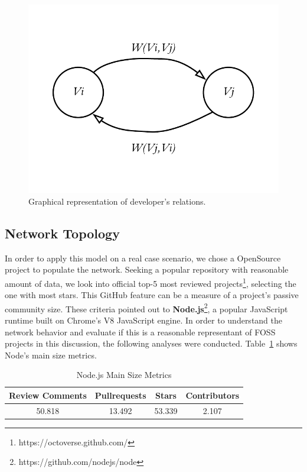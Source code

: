 \documentclass[conference]{IEEEtran}
\begin{document}
\begin{figure}[htbp]
\centerline{\includegraphics{images/graph}}
\caption{Graphical representation of developer's relations.}
\label{fig:graph}
\end{figure}

\subsection{Network Topology}
In order to apply this model on a real case scenario, we chose a OpenSource project to populate the network. Seeking a popular repository with reasonable amount of data, we look into official top-5 most reviewed projects\footnote{https://octoverse.github.com/}, selecting the one with most stars. This GitHub feature can be a measure of a project's passive community size\cite{sheoran2014}. These criteria pointed out to \textbf{Node.js}\footnote{https://github.com/nodejs/node}, a popular JavaScript runtime built on Chrome's V8 JavaScript engine. In order to understand the network behavior and evaluate if this is a reasonable representant of FOSS projects in this discussion, the following analyses were conducted. Table~\ref{tab:sizemetrics} shows Node's main size metrics.

\begin{table}[htbp]
\caption{Node.js Main Size Metrics}
\begin{center}
\begin{tabular}{|c|c|c|c|}
\hline
\textbf{Review Comments} & \textbf{Pullrequests}& \textbf{Stars}& \textbf{Contributors} \\
\hline
50.818 & 13.492 & 53.339 & 2.107 \\
\hline
\end{tabular}
\label{tab:sizemetrics}
\end{center}
\end{table}
\end{document}
